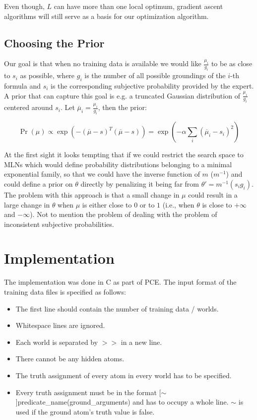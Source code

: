 \documentclass[12pt]{article}
\begin{document}
Even though, $L$ can have more than one local optimum, 
gradient ascent algorithms will still serve as a basis for our 
optimization algorithm.

\subsection{Choosing the Prior}\label{sec:choosing_prior}

Our goal is that when no training data is available we would like 
$\frac{\mu_{i}}{g_{i}}$ to be as close to $s_{i}$ as possible, 
where $g_{i}$ is the number of all possible groundings of the 
$i$-th formula and $s_{i}$ is the corresponding subjective probability 
provided by the expert. A prior that can capture this goal is e.g. a truncated
Gaussian distribution of $\frac{\mu_{i}}{g_{i}}$ centered around $s_{i}$.
Let $\overline{\mu}_{i}= \frac{\mu_{i}}{g_{i}}$, then the prior:

\begin{equation}\label{eq-prior-def}
  \Pr(\mu) \propto 
      \exp \left(
       -(\overline{\mu} - s)^{T} (\overline{\mu} - s)
       \right)=
     \exp \left(- \alpha \sum_{i} (\overline{\mu}_{i}- s_{i})^{2} \right)
\end{equation}

At the first sight it looks tempting that if we could restrict the search space
 to MLNs which would define probability distributions belonging to a minimal 
exponential family, so that we could have the inverse function of $m$ 
($m^{-1}$) and could define a prior on $\theta$ directly by penalizing it
being far from $\theta'=m^{-1}(s_{i} g_{i})$. The problem with this approach is
that a small change in $\mu$ could result in a large change in $\theta$ when 
$\mu$ is either close to $0$ or to $1$ (i.e., when $\theta$ is close to 
$+\infty$ and $-\infty$). Not to mention the problem of dealing with the problem
of inconsistent subjective probabilities.

\section{Implementation}

The implementation was done in C as part of PCE.
The input format of the training data files is specified as follows:
\begin{itemize}
   \item The first line should contain the number of training data / 
         worlds.
   \item Whitespace lines are ignored.
   \item Each world is separated by $>>$ in a new line.
   \item There cannot be any hidden atoms.
   \item The truth assignment of every atom in every world has to be specified.
   \item Every truth assignment must be in the format 
          [$\sim$]predicate\_name(ground\_arguments) and has to occupy a 
          whole line. $\sim$ is used if the ground atom's truth 
          value is false.
\end{itemize}
\end{document}
